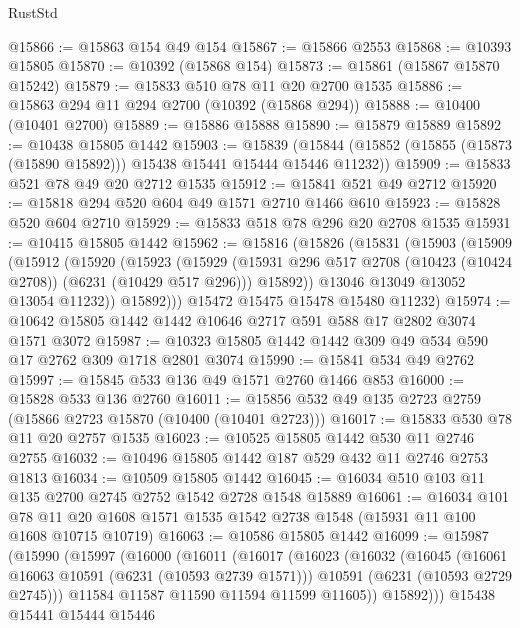 \begin{lexlean}{RustStd}
\begin{coremodule}
{{@15866 := @15863 @154 @49 @154
@15867 := @15866 @2553
@15868 := @10393 @15805
@15870 := @10392 (@15868 @154)
@15873 := @15861 (@15867 @15870 @15242)
@15879 := @15833 @510 @78 @11 @20 @2700 @1535
@15886 := @15863 @294 @11 @294 @2700 (@10392 (@15868 @294))
@15888 := @10400 (@10401 @2700)
@15889 := @15886 @15888
@15890 := @15879 @15889
@15892 := @10438 @15805 @1442
@15903 := @15839
    (@15844 (@15852 (@15855 (@15873 (@15890 @15892))) @15438 @15441 @15444 @15446 @11232))
@15909 := @15833 @521 @78 @49 @20 @2712 @1535
@15912 := @15841 @521 @49 @2712
@15920 := @15818 @294 @520 @604 @49 @1571 @2710 @1466 @610
@15923 := @15828 @520 @604 @2710
@15929 := @15833 @518 @78 @296 @20 @2708 @1535
@15931 := @10415 @15805 @1442
@15962 := @15816
    (@15826
      (@15831
        (@15903
          (@15909
            (@15912
              (@15920
                (@15923
                  (@15929
                    (@15931 @296 @517 @2708 (@10423 (@10424 @2708)) (@6231 (@10429 @517 @296)))
                    @15892))
                @13046
                @13049
                @13052
                @13054
                @11232))
            @15892)))
      @15472
      @15475
      @15478
      @15480
      @11232)
@15974 := @10642 @15805 @1442 @1442 @10646 @2717 @591 @588 @17 @2802 @3074 @1571 @3072
@15987 := @10323 @15805 @1442 @1442 @309 @49 @534 @590 @17 @2762 @309 @1718 @2801 @3074
@15990 := @15841 @534 @49 @2762
@15997 := @15845 @533 @136 @49 @1571 @2760 @1466 @853
@16000 := @15828 @533 @136 @2760
@16011 := @15856 @532 @49 @135 @2723 @2759 (@15866 @2723 @15870 (@10400 (@10401 @2723)))
@16017 := @15833 @530 @78 @11 @20 @2757 @1535
@16023 := @10525 @15805 @1442 @530 @11 @2746 @2755
@16032 := @10496 @15805 @1442 @187 @529 @432 @11 @2746 @2753 @1813
@16034 := @10509 @15805 @1442
@16045 := @16034 @510 @103 @11 @135 @2700 @2745 @2752 @1542 @2728 @1548 @15889
@16061 := @16034
    @101
    @78
    @11
    @20
    @1608
    @1571
    @1535
    @1542
    @2738
    @1548
    (@15931 @11 @100 @1608 @10715 @10719)
@16063 := @10586 @15805 @1442
@16099 := @15987
    (@15990
      (@15997
        (@16000
          (@16011
            (@16017
              (@16023
                (@16032
                  (@16045
                    (@16061 @16063 @10591 (@6231 (@10593 @2739 @1571)))
                    @10591
                    (@6231 (@10593 @2729 @2745)))
                  @11584
                  @11587
                  @11590
                  @11594
                  @11599
                  @11605))
              @15892)))
        @15438
        @15441
        @15444
        @15446
}}
\end{coremodule}
\end{lexlean}
